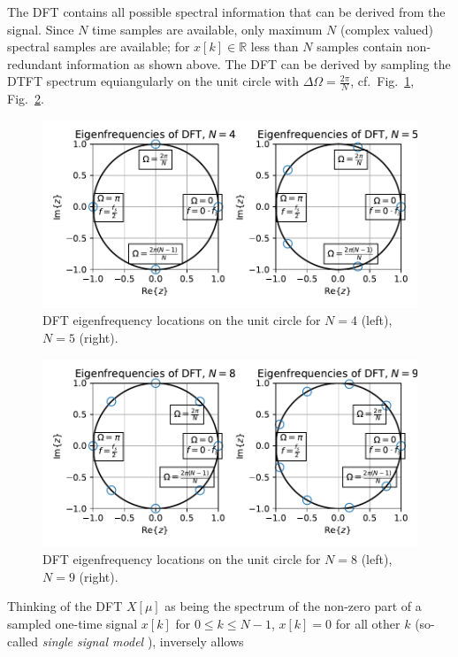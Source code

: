 \documentclass[11pt,a4paper,DIV=12]{scrartcl}
\begin{document}
The DFT contains all possible spectral information that can be derived from the
signal.
%
Since $N$ time samples are available, only maximum $N$ (complex valued) spectral
samples are available; for $x[k]\in\mathbb{R}$ less than $N$ samples contain
non-redundant information as shown above.
%
The DFT can be derived by sampling the DTFT spectrum equiangularly on the unit
circle with $\Delta\Omega=\frac{2\pi}{N}$,
cf.~Fig.~\ref{DFT_Eigenfrequenzen_N4_N5}, Fig.~\ref{DFT_Eigenfrequenzen_N8_N9}.
%
\begin{figure}
		\centering
		\includegraphics[]{graphics/DFT_Eigenfrequencies_N4_N5.pdf}
		\caption{DFT eigenfrequency locations on the unit circle for $N=4$ (left),
		$N=5$ (right).}
		\label{DFT_Eigenfrequenzen_N4_N5}
\end{figure}
\begin{figure}
		\centering
		\includegraphics[]{graphics/DFT_Eigenfrequencies_N8_N9.pdf}
		\caption{DFT eigenfrequency locations on the unit circle for $N=8$ (left),
		$N=9$ (right).}
		\label{DFT_Eigenfrequenzen_N8_N9}
\end{figure}
%
Thinking of the DFT $X[\mu]$ as being the spectrum of the non-zero part of a
sampled one-time signal $x[k]$ for $0\leq k\leq N-1$, $x[k]=0$ for all other
$k$ (so-called \textit{single signal model} \cite{Moeser2011}), inversely allows
\end{document}
